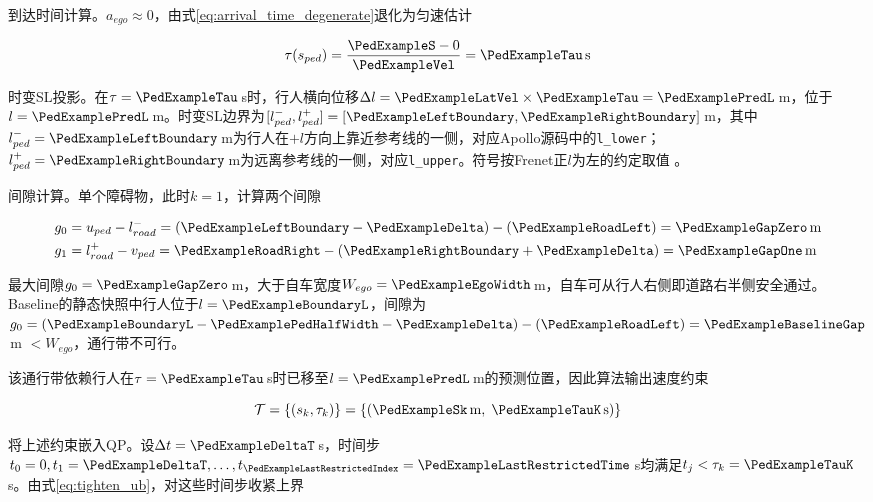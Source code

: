 到达时间计算。$a_{ego} \approx 0$，由式\eqref{eq:arrival_time_degenerate}退化为匀速估计

\begin{equation*}
    \tau(s_{ped}) = \frac{\PedExampleS - 0}{\PedExampleVel} = \PedExampleTau\,\text{s}
\end{equation*}

时变SL投影。在$\tau = \PedExampleTau$\,s时，行人横向位移$\Delta l = \PedExampleLatVel \times \PedExampleTau = \PedExamplePredL$\,m，位于$l = \PedExamplePredL$\,m。时变SL边界为$[l_{ped}^{-}, l_{ped}^{+}] = [\PedExampleLeftBoundary, \PedExampleRightBoundary]$\,m，其中$l_{ped}^{-}=\PedExampleLeftBoundary$\,m为行人在$+l$方向上靠近参考线的一侧，对应Apollo源码中的\texttt{l\_lower}；$l_{ped}^{+}=\PedExampleRightBoundary$\,m为远离参考线的一侧，对应\texttt{l\_upper}。符号按Frenet正$l$为左的约定取值 。

间隙计算。单个障碍物，此时$k = 1$，计算两个间隙

\begin{equation*}
\begin{aligned}
    g_0 &= u_{ped} - l_{road}^{-} = (\PedExampleLeftBoundary - \PedExampleDelta) - (\PedExampleRoadLeft) = \PedExampleGapZero\,\text{m} \\
    g_1 &= l_{road}^{+} - v_{ped} = \PedExampleRoadRight - (\PedExampleRightBoundary + \PedExampleDelta) = \PedExampleGapOne\,\text{m}
\end{aligned}
\end{equation*}

最大间隙$g_0 = \PedExampleGapZero$\,m，大于自车宽度$W_{ego} = \PedExampleEgoWidth$\,m，自车可从行人右侧即道路右半侧安全通过。Baseline的静态快照中行人位于$l = \PedExampleBoundaryL$，间隙为$g_0 = (\PedExampleBoundaryL - \PedExamplePedHalfWidth - \PedExampleDelta) - (\PedExampleRoadLeft) = \PedExampleBaselineGap$\,m $< W_{ego}$，通行带不可行。

该通行带依赖行人在$\tau = \PedExampleTau$\,s时已移至$l = \PedExamplePredL$\,m的预测位置，因此算法输出速度约束

\begin{equation*}
    \mathcal{T} = \{(s_k, \tau_k)\} = \{(\PedExampleSk\,\text{m},\; \PedExampleTauK\,\text{s})\}
\end{equation*}

将上述约束嵌入QP。设$\Delta t = \PedExampleDeltaT$\,s，时间步$t_0 = 0, t_1 = \PedExampleDeltaT, \ldots, t_{\PedExampleLastRestrictedIndex} = \PedExampleLastRestrictedTime$\,s均满足$t_j < \tau_k = \PedExampleTauK$\,s。由式\eqref{eq:tighten_ub}，对这些时间步收紧上界

